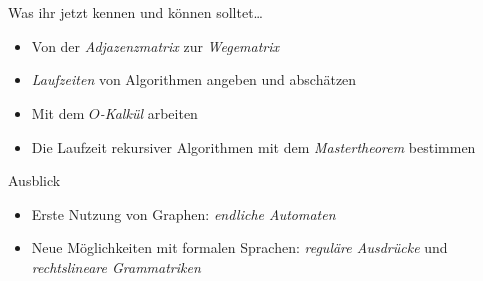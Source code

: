 \section{}
	\begin{frame}{Was ihr jetzt kennen und können solltet\dots}
			\begin{itemize}
				\item Von der \emph{Adjazenzmatrix} zur \emph{Wegematrix}
				\item \emph{Laufzeiten} von Algorithmen angeben und abschätzen
				\item Mit dem \emph{$O$-Kalkül} arbeiten
				\item Die Laufzeit rekursiver Algorithmen mit dem \emph{Mastertheorem} bestimmen
			\end{itemize}
	
	\end{frame}
	\begin{frame}{Ausblick}
		\begin{itemize}
			\item Erste Nutzung von Graphen: \emph{endliche Automaten}
			\item Neue Möglichkeiten mit formalen Sprachen: \emph{reguläre Ausdrücke} und \emph{rechtslineare Grammatriken} 
		\end{itemize}
	\end{frame}
\section{}
\questionframe
\lastframe
{}
